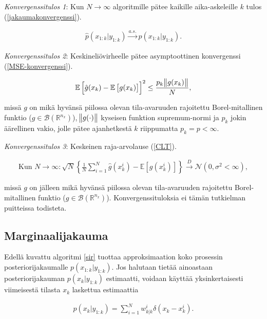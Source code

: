 \documentclass[
  12pt,
  a4paper, twoside]{book}
\begin{document}
\textit{Konvergenssitulos 1}: Kun \(N \to \infty\) algoritmille pätee kaikille aika-askeleille \(k\) tulos (\ref{jakaumakonvergenssi}).

\begin{align}\label{jakaumakonvergenssi}
\hat{p}(x_{1:k}|y_{1:k}) \xrightarrow{a.s.} p(x_{1:k}|y_{1:k}).
\end{align}

\textit{Konvergenssitulos 2}: Keskineliövirheelle pätee asymptoottinen konvergenssi (\ref{MSE-konvergenssi}).

\begin{align}\label{MSE-konvergenssi}
\mathbb{E}\left[\hat{g}(x_k)-\mathbb{E}\left[g(x_k)\right]\right]^2\leq\frac{p_k\norm{g(x_k)}}{N},
\end{align}

\noindent missä \(g\) on mikä hyvänsä piilossa olevan tila-avaruuden rajoitettu Borel-mitallinen funktio (\(g \in \mathcal{B}(\mathbb{R}^{n_x})\)), \(\norm{g(\cdot)}\) kyseisen funktion supremum-normi ja \(p_k\) jokin äärellinen vakio, jolle pätee ajanhetkestä \(k\) riippumatta \(p_k=p<\infty\).

\textit{Konvergenssitulos 3}: Keskeinen raja-arvolause (\ref{CLT}).

\begin{align}\label{CLT}
\text{Kun } N \to \infty: \sqrt{N} \left\{ \frac{1}{N} \sum_{i=1}^N \hat{g}(x_k^i) -\mathbb{E}\left[g(x_k^i)\right] \right\} \xrightarrow{D} \mathcal{N}(0,\sigma^2 < \infty),
\end{align}

\noindent missä \(g\) on jälleen mikä hyvänsä piilossa olevan tila-avaruuden rajoitettu Borel-mitallinen funktio (\(g \in \mathcal{B}(\mathbb{R}^{n_x})\)). Konvergenssituloksia ei tämän tutkielman puitteissa todisteta.

\subsection{Marginaalijakauma}

Edellä kuvattu algoritmi \ref{sir} tuottaa approksimaation koko prosessin posteriorijakaumalle \(p(x_{1:k}|y_{1:k})\). Jos halutaan tietää ainoastaan posteriorijakauman \(p(x_k|y_{1:k})\) estimaatti, voidaan käyttää yksinkertaisesti viimeisestä tilasta \(x_k\) laskettua estimaattia

\begin{align}
\hat{p}(x_{k}|y_{1:k})=\sum_{i=1}^{N}w_{k|k}^i \delta(x_{k}-x_{k}^i).
\end{align}
\end{document}
